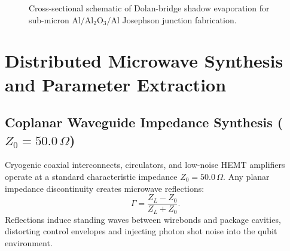 \documentclass[10pt,journal,compsoc]{IEEEtran}
\begin{document}
\begin{figure}[!ht]
\centering
{}
\caption{Cross-sectional schematic of Dolan-bridge shadow evaporation for sub-micron $\text{Al}/\text{Al}_2\text{O}_3/\text{Al}$ Josephson junction fabrication.}
\label{fig:dolan}
\end{figure}

\section{Distributed Microwave Synthesis and Parameter Extraction}

\subsection{Coplanar Waveguide Impedance Synthesis (\texorpdfstring{$Z_0 = 50.0\,\Omega$}{Z0 = 50.0 Ohm})}
Cryogenic coaxial interconnects, circulators, and low-noise HEMT amplifiers operate at a standard characteristic impedance $Z_0 = 50.0\,\Omega$. Any planar impedance discontinuity creates microwave reflections:
\begin{equation}
\Gamma = \frac{Z_L - Z_0}{Z_L + Z_0}.
\end{equation}
Reflections induce standing waves between wirebonds and package cavities, distorting control envelopes and injecting photon shot noise into the qubit environment.
\end{document}
